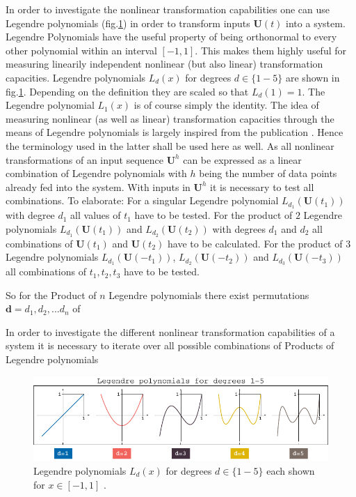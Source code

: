 In order to investigate the nonlinear transformation capabilities one can use Legendre polynomials  (fig.\ref{fig:legendreDegrees}) in order to transform inputs $\textbf{U}(t)$ into a system. Legendre Polynomials have the useful property of being orthonormal to every other polynomial within an interval $\left[-1,1\right]$. This makes them highly useful for measuring linearily independent nonlinear (but also linear) transformation capacities. Legendre polynomials $L_{d}(x)$ for degrees $d \in \{1-5\}$ are shown in fig.\ref{fig:legendreDegrees}. Depending on the definition they are scaled so that $L_{d}(1)=1$. The Legendre polynomial $L_{1}(x)$ is of course simply the identity. 
The idea of measuring nonlinear (as well as linear) transformation capacities through the means of Legendre polynomials is largely inspired from the publication \cite{DAM12}. Hence the terminology used in the latter shall be used here as well. 
As all nonlinear transformations of an input sequence $\textbf{U}^{h}$ can be expressed as a linear combination of Legendre  polynomials with $h$ being the number of data points already fed into the system. With inputs in $\textbf{U}^{h}$ it is necessary to test all combinations. To elaborate: 
For a singular Legendre polynomial $L_{d_{1}}(\textbf{U}(t_1))$ with degree $d_1$ all values of $t_1$ have to be tested.
For the product of $2$ Legendre polynomials $L_{d_{1}}(\textbf{U}(t_1))$ and $L_{d_{2}}(\textbf{U}(t_2))$ with degrees $d_1$ and $d_2$ all combinations of $\textbf{U}(t_1)$ and $\textbf{U}(t_2)$ have to be calculated.
For the product of $3$ Legendre polynomials $L_{d_{1}}(\textbf{U}(-t_1))$, $L_{d_{2}}(\textbf{U}(-t_2))$ and $L_{d_{3}}(\textbf{U}(-t_3))$ all combinations of ${t_1,t_2,t_3}$ have to be tested.

So for the Product of $n$ Legendre polynomials there exist permutations ${\textbf{d}}={d_1,d_2,...d_n}$ of 






In order to investigate the different nonlinear transformation capabilities of a system it is necessary to iterate over all possible combinations of Products of Legendre polynomials  

\begin{figure}
	\includegraphics[width=0.99\linewidth]{pics/legendre_degrees}
	\caption{Legendre polynomials $L_{d}(x)$ for degrees $d \in \{1-5\}$ each shown for $x \in [-1,1]$ .}
	\label{fig:legendreDegrees}
\end{figure}

